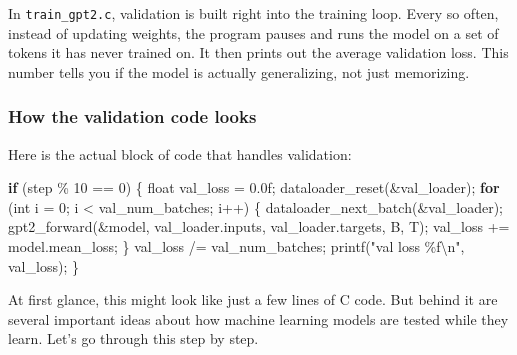 \documentclass[
  letterpaper,
  DIV=11,
  numbers=noendperiod]{scrreprt}
\newenvironment{Shaded}{\begin{snugshade}}{\end{snugshade}}
\newcommand{\BuiltInTok}[1]{\textcolor[rgb]{0.00,0.23,0.31}{#1}}
\newcommand{\ControlFlowTok}[1]{\textcolor[rgb]{0.00,0.23,0.31}{\textbf{#1}}}
\newcommand{\DataTypeTok}[1]{\textcolor[rgb]{0.68,0.00,0.00}{#1}}
\newcommand{\DecValTok}[1]{\textcolor[rgb]{0.68,0.00,0.00}{#1}}
\newcommand{\FloatTok}[1]{\textcolor[rgb]{0.68,0.00,0.00}{#1}}
\newcommand{\NormalTok}[1]{\textcolor[rgb]{0.00,0.23,0.31}{#1}}
\newcommand{\OperatorTok}[1]{\textcolor[rgb]{0.37,0.37,0.37}{#1}}
\newcommand{\SpecialCharTok}[1]{\textcolor[rgb]{0.37,0.37,0.37}{#1}}
\newcommand{\StringTok}[1]{\textcolor[rgb]{0.13,0.47,0.30}{#1}}
\begin{document}
In \texttt{train\_gpt2.c}, validation is built right into the training
loop. Every so often, instead of updating weights, the program pauses
and runs the model on a set of tokens it has never trained on. It then
prints out the average validation loss. This number tells you if the
model is actually generalizing, not just memorizing.

\subsubsection{How the validation code
looks}\label{how-the-validation-code-looks}

Here is the actual block of code that handles validation:

\begin{Shaded}
\begin{Highlighting}[]
\ControlFlowTok{if} \OperatorTok{(}\NormalTok{step }\OperatorTok{\%} \DecValTok{10} \OperatorTok{==} \DecValTok{0}\OperatorTok{)} \OperatorTok{\{}
    \DataTypeTok{float}\NormalTok{ val\_loss }\OperatorTok{=} \FloatTok{0.0}\BuiltInTok{f}\OperatorTok{;}
\NormalTok{    dataloader\_reset}\OperatorTok{(\&}\NormalTok{val\_loader}\OperatorTok{);}
    \ControlFlowTok{for} \OperatorTok{(}\DataTypeTok{int}\NormalTok{ i }\OperatorTok{=} \DecValTok{0}\OperatorTok{;}\NormalTok{ i }\OperatorTok{\textless{}}\NormalTok{ val\_num\_batches}\OperatorTok{;}\NormalTok{ i}\OperatorTok{++)} \OperatorTok{\{}
\NormalTok{        dataloader\_next\_batch}\OperatorTok{(\&}\NormalTok{val\_loader}\OperatorTok{);}
\NormalTok{        gpt2\_forward}\OperatorTok{(\&}\NormalTok{model}\OperatorTok{,}\NormalTok{ val\_loader}\OperatorTok{.}\NormalTok{inputs}\OperatorTok{,}\NormalTok{ val\_loader}\OperatorTok{.}\NormalTok{targets}\OperatorTok{,}\NormalTok{ B}\OperatorTok{,}\NormalTok{ T}\OperatorTok{);}
\NormalTok{        val\_loss }\OperatorTok{+=}\NormalTok{ model}\OperatorTok{.}\NormalTok{mean\_loss}\OperatorTok{;}
    \OperatorTok{\}}
\NormalTok{    val\_loss }\OperatorTok{/=}\NormalTok{ val\_num\_batches}\OperatorTok{;}
\NormalTok{    printf}\OperatorTok{(}\StringTok{"val loss }\SpecialCharTok{\%f\textbackslash{}n}\StringTok{"}\OperatorTok{,}\NormalTok{ val\_loss}\OperatorTok{);}
\OperatorTok{\}}
\end{Highlighting}
\end{Shaded}

At first glance, this might look like just a few lines of C code. But
behind it are several important ideas about how machine learning models
are tested while they learn. Let's go through this step by step.
\end{document}
